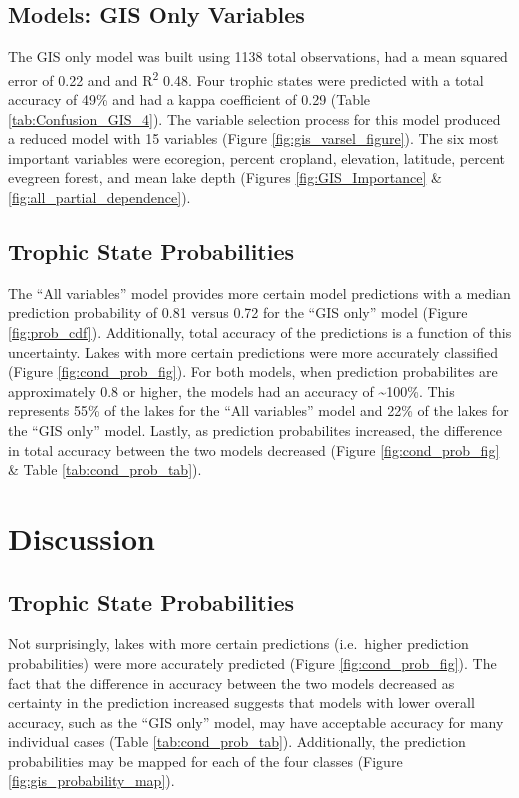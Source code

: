 \documentclass[12pt,]{article}
\begin{document}
\subsection{Models: GIS Only Variables}\label{models-gis-only-variables}

The GIS only model was built using 1138 total observations, had a mean
squared error of 0.22 and and R\textsuperscript{2} 0.48. Four trophic
states were predicted with a total accuracy of 49\% and had a kappa
coefficient of 0.29 (Table \ref{tab:Confusion_GIS_4}). The variable
selection process for this model produced a reduced model with 15
variables (Figure \ref{fig:gis_varsel_figure}). The six most important
variables were ecoregion, percent cropland, elevation, latitude, percent
evegreen forest, and mean lake depth (Figures \ref{fig:GIS_Importance}
\& \ref{fig:all_partial_dependence}).

\subsection{Trophic State
Probabilities}\label{trophic-state-probabilities-1}

The ``All variables'' model provides more certain model predictions with
a median prediction probability of 0.81 versus 0.72 for the ``GIS only''
model (Figure \ref{fig:prob_cdf}). Additionally, total accuracy of the
predictions is a function of this uncertainty. Lakes with more certain
predictions were more accurately classified (Figure
\ref{fig:cond_prob_fig}). For both models, when prediction probabilites
are approximately 0.8 or higher, the models had an accuracy of
\textasciitilde{}100\%. This represents 55\% of the lakes for the ``All
variables'' model and 22\% of the lakes for the ``GIS only'' model.
Lastly, as prediction probabilites increased, the difference in total
accuracy between the two models decreased (Figure
\ref{fig:cond_prob_fig} \& Table \ref{tab:cond_prob_tab}).

\section{Discussion}\label{discussion}

\subsection{Trophic State
Probabilities}\label{trophic-state-probabilities-2}

Not surprisingly, lakes with more certain predictions (i.e.~higher
prediction probabilities) were more accurately predicted (Figure
\ref{fig:cond_prob_fig}). The fact that the difference in accuracy
between the two models decreased as certainty in the prediction
increased suggests that models with lower overall accuracy, such as the
``GIS only'' model, may have acceptable accuracy for many individual
cases (Table \ref{tab:cond_prob_tab}). Additionally, the prediction
probabilities may be mapped for each of the four classes (Figure
\ref{fig:gis_probability_map}).
\end{document}
